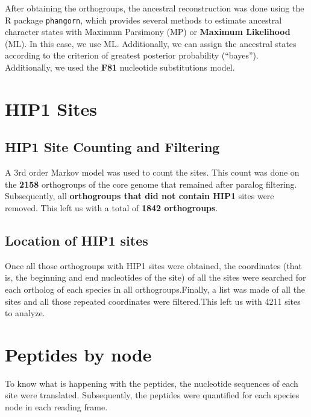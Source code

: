 \documentclass[
]{book}
\begin{document}
After obtaining the orthogroups, the ancestral reconstruction was done using the R package \texttt{phangorn}, which provides several methods to estimate ancestral character states with Maximum Parsimony (MP) or \textbf{Maximum Likelihood} (ML). In this case, we use ML. Additionally, we can assign the ancestral states according to the criterion of greatest posterior probability (``bayes''). Additionally, we used the \textbf{F81} nucleotide substitutions model.

\hypertarget{hip1-sites}{%
\section{HIP1 Sites}\label{hip1-sites}}

\hypertarget{hip1-site-counting-and-filtering}{%
\subsection{HIP1 Site Counting and Filtering}\label{hip1-site-counting-and-filtering}}

A 3rd order Markov model was used to count the sites. This count was done on the \textbf{2158} orthogroups of the core genome that remained after paralog filtering. Subsequently, all \textbf{orthogroups that did not contain HIP1} sites were removed. This left us with a total of \textbf{1842 orthogroups}.

\hypertarget{location-of-hip1-sites}{%
\subsection{Location of HIP1 sites}\label{location-of-hip1-sites}}

Once all those orthogroups with HIP1 sites were obtained, the coordinates (that is, the beginning and end nucleotides of the site) of all the sites were searched for each ortholog of each species in all orthogroups.Finally, a list was made of all the sites and all those repeated coordinates were filtered.This left us with 4211 sites to analyze.

\hypertarget{peptides-by-node}{%
\section{Peptides by node}\label{peptides-by-node}}

To know what is happening with the peptides, the nucleotide sequences of each site were translated. Subsequently, the peptides were quantified for each species node in each reading frame.
\end{document}
